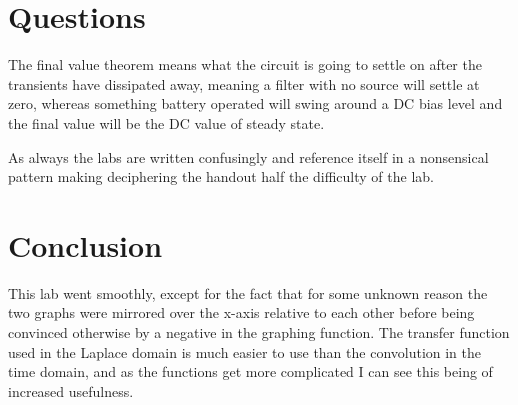 \documentclass[12pt,a4paper]{article}
\begin{document}
\section{Questions}
The final value theorem means what the circuit is going to settle on after the transients have dissipated away, meaning a filter with no source will settle at zero, whereas something battery operated will swing around a DC bias level and the final value will be the DC value of steady state. 
\vspace{12pt}

As always the labs are written confusingly and reference itself in a nonsensical pattern making deciphering the handout half the difficulty of the lab. 
\section{Conclusion}
This lab went smoothly, except for the fact that for some unknown reason the two graphs were mirrored over the x-axis relative to each other before being convinced otherwise by a negative in the graphing function. The transfer function used in the Laplace domain is much easier to use than the convolution in the time domain, and as the functions get more complicated I can see this being of increased usefulness. 
\end{document}
